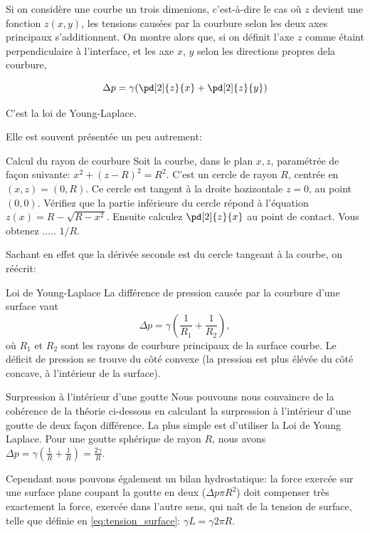 Si on considère une courbe un trois dimenions, c'est-à-dire le cas où $z$ devient une fonction $z(x,y)$, les tensions causées par la courbure selon les deux axes principaux s'additionnent. 
On montre alors que, si on définit l'axe $z$ comme étaint perpendiculaire à l'interface, et les axe $x$, $y$ selon les directions propres dela courbure, 

\begin{displaymath}
  \Delta p = \gamma (\pd[2]{z}{x} + \pd[2]{z}{y})
\end{displaymath}

C'est la loi de Young-Laplace. 

Elle est souvent présentée un peu autrement: 

\begin{studentinvestigation}{Calcul du rayon de courbure}
  Soit la courbe, dans le plan $x,z$, paramétrée de façon suivante: $x^2 + (z-R)^2  = R^2$.  C'est un cercle de rayon $R$, centrée en $(x,z)=(0,R)$. Ce cercle est tangent à la droite hozizontale $z=0$, au point $(0,0)$. Vérifiez que la partie inférieure du cercle répond à l'équation $z(x)=R-\sqrt{R-x^2}$. Ensuite calculez $\pd[2]{z}{x}$ au point de contact. Vous obtenez ..... $1/R$. 
\end{studentinvestigation}

Sachant en effet que la dérivée seconde est  du cercle tangeant à la courbe, on réécrit: 

\begin{key}{Loi de Young-Laplace}
  La différence de pression causée par la courbure d'une surface vaut
  \begin{equation}
  \Delta p = \gamma \left(\frac{1}{R_1} + \frac{1}{R_2}\right), 
    \label{eq:Young-Laplace}
  \end{equation}
où $R_1$ et $R_2$ sont les rayons de courbure principaux de la surface courbe. Le déficit de pression se trouve du côté convexe (la pression est plus élévée du côté concave, à l'intérieur de la surface). 
\end{key}

\begin{application}{Surpression à l'intérieur d'une goutte}
  Nous pouvouns nous convaincre de la cohérence de la théorie ci-dessous en calculant la surpression à l'intérieur d'une goutte de deux façon différence. La plus simple est d'utiliser la Loi de Young Laplace. Pour une goutte sphérique de rayon $R$, nous avons $\Delta p = \gamma \left(\frac{1}{R}+\frac{1}{R}\right) = \frac{2\gamma}{R}$. 

  Cependant nous pouvons également un bilan hydrostatique: la force exercée sur une surface plane coupant la goutte en deux ($\Delta p \pi R^2$) doit compenser très exactement la force, exercée dans l'autre sens, qui naît de la tension de surface, telle que définie en \eqref{eq:tension_surface}: $\gamma L = \gamma 2\pi R$. 
  \begin{center}
    
  \end{center}

\end{application}

